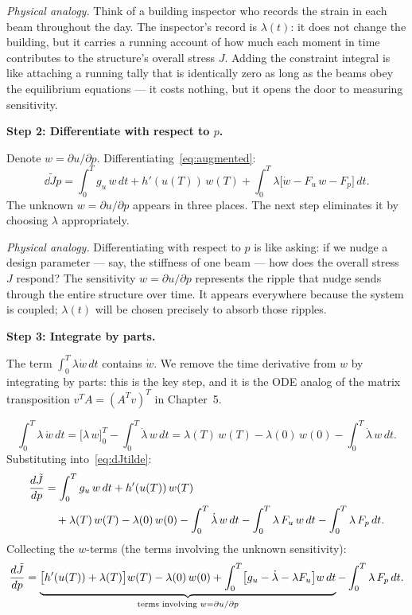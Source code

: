 \medskip\noindent\textit{Physical analogy.}
Think of a building inspector who records the strain in each beam throughout the day.
The inspector's record is $\lambda(t)$: it does not change the building,
but it carries a running account of how much each moment in time contributes to
the structure's overall stress $J$.
Adding the constraint integral is like attaching a running tally that is identically
zero as long as the beams obey the equilibrium equations --- it costs nothing,
but it opens the door to measuring sensitivity.

\medskip
\textbf{Step 2: Differentiate with respect to $p$.}

Denote $w = \partial u/\partial p$. Differentiating~\eqref{eq:augmented}:
\begin{equation}
  \dd{\tilde{J}}{p}
  = \int_0^T g_u\,w\,dt + h'(u(T))\,w(T)
    + \int_0^T \lambda\bigl[\dot{w} - F_u\,w - F_p\bigr]\,dt.
  \label{eq:dJtilde}
\end{equation}
The unknown $w = \partial u/\partial p$ appears in three places.
The next step eliminates it by choosing $\lambda$ appropriately.

\medskip\noindent\textit{Physical analogy.}
Differentiating with respect to $p$ is like asking: if we nudge a design parameter ---
say, the stiffness of one beam --- how does the overall stress $J$ respond?
The sensitivity $w = \partial u/\partial p$ represents the ripple that nudge sends
through the entire structure over time. It appears everywhere because the system
is coupled; $\lambda(t)$ will be chosen precisely to absorb those ripples.

\medskip
\textbf{Step 3: Integrate by parts.}

The term $\int_0^T \lambda \dot{w}\,dt$ contains $\dot{w}$.
We remove the time derivative from $w$ by integrating by parts:
this is the key step, and it is the ODE analog of the matrix
transposition $v^T A = (A^T v)^T$ in Chapter~5.

\begin{equation}
  \int_0^T \lambda\,\dot{w}\,dt
  = \bigl[\lambda\,w\bigr]_0^T - \int_0^T \dot{\lambda}\,w\,dt
  = \lambda(T)\,w(T) - \lambda(0)\,w(0) - \int_0^T \dot{\lambda}\,w\,dt.
  \label{eq:IBP}
\end{equation}
Substituting into~\eqref{eq:dJtilde}:
\begin{align}
  \frac{d \tilde{J}}{d p}
  &= \int_0^T g_u\,w\,dt + h'(u(T))\,w(T) \notag\\
  &\quad + \lambda(T)\,w(T) - \lambda(0)\,w(0)
    - \int_0^T \dot{\lambda}\,w\,dt
    - \int_0^T \lambda\,F_u\,w\,dt
    - \int_0^T \lambda\,F_p\,dt.
  \label{eq:dJfull}
\end{align}
Collecting the $w$-terms (the terms involving the unknown sensitivity):
\begin{equation}
  \dd{\tilde{J}}{p}
  = \underbrace{\bigl[h'(u(T)) + \lambda(T)\bigr]w(T)
    - \lambda(0)\,w(0)
    + \int_0^T \bigl[g_u - \dot{\lambda} - \lambda F_u\bigr]w\,dt}_{%
    \text{terms involving } w = \partial u/\partial p}
    - \int_0^T \lambda\,F_p\,dt.
  \label{eq:dJcollected}
\end{equation}

